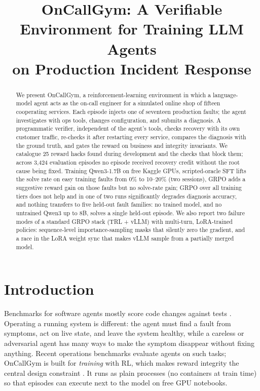 \documentclass[11pt]{article}
\title{OnCallGym: A Verifiable Environment for Training LLM Agents\\on Production Incident Response}
\author{}
\date{}
\begin{document}
\maketitle

\begin{abstract}
We present OnCallGym, a reinforcement-learning environment in which a language-model agent acts as the on-call engineer for a simulated online shop of fifteen cooperating services. Each episode injects one of seventeen production faults; the agent investigates with ops tools, changes configuration, and submits a diagnosis. A programmatic verifier, independent of the agent's tools, checks recovery with its own customer traffic, re-checks it after restarting every service, compares the diagnosis with the ground truth, and gates the reward on business and integrity invariants. We catalogue 25 reward hacks found during development and the checks that block them; across 3{,}424 evaluation episodes no episode received recovery credit without the root cause being fixed. Training Qwen3-1.7B on free Kaggle GPUs, scripted-oracle SFT lifts the solve rate on easy training faults from 0\% to 10--20\% (two sessions), GRPO adds a suggestive reward gain on those faults but no solve-rate gain; GRPO over all training tiers does not help and in one of two runs significantly degrades diagnosis accuracy, and nothing transfers to five held-out fault families: no trained model, and no untrained Qwen3 up to 8B, solves a single held-out episode. We also report two failure modes of a standard GRPO stack (TRL + vLLM) with multi-turn, LoRA-trained policies: sequence-level importance-sampling masks that silently zero the gradient, and a race in the LoRA weight sync that makes vLLM sample from a partially merged model.
\end{abstract}

\section{Introduction}
Benchmarks for software agents mostly score code changes against tests \citep{jimenez2024swebench}. Operating a running system is different: the agent must find a fault from symptoms, act on live state, and leave the system healthy, while a careless or adversarial agent has many ways to make the symptom disappear without fixing anything. Recent operations benchmarks \citep{chen2025aiopslab,jha2025itbench} evaluate agents on such tasks; OnCallGym is built for \emph{training} with RL, which makes reward integrity the central design constraint \citep{skalse2022rewardhacking}. It runs as plain processes (no containers at train time) so that episodes can execute next to the model on free GPU notebooks.
\end{document}
